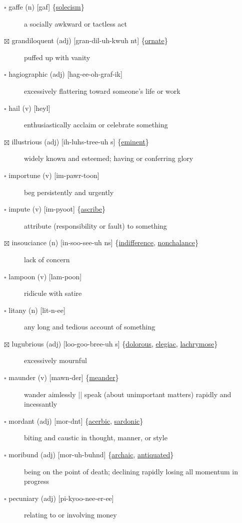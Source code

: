 \documentclass[11pt]{article}
\begin{document}
\begin{description}
\item[{$\square$ \label{org5dcf63b}gaffe (n) [gaf] \{\hyperref[orgc319573]{solecism}\}}] a socially awkward or tactless act
\item[{$\boxtimes$ \label{org409e1f2}grandiloquent (adj) [gran-dil-uh-kwuh nt] \{\hyperref[orgdab45ee]{ornate}\}}] puffed up with vanity
\item[{$\square$ hagiographic (adj) [hag-ee-oh-graf-ik]}] excessively flattering toward someone's life or work
\item[{$\square$ hail (v) [heyl]}] enthusiastically acclaim or celebrate something
\item[{$\boxtimes$ \label{org0ad47af}illustrious (adj) [ih-luhs-tree-uh s] \{\hyperref[orga5ef3a2]{eminent}\}}] widely known and esteemed; having or conferring glory
\item[{$\square$ importune (v) [im-pawr-toon]}] beg persistently and urgently
\item[{$\square$ \label{org41a621c}impute (v) [im-pyoot] \{\hyperref[org302821a]{ascribe}\}}] attribute (responsibility or fault) to something
\item[{$\boxtimes$ \label{org2634905} \label{org831b3eb}insouciance (n) [in-soo-see-uh ns] \{\hyperref[org95078ca]{indifference}, \hyperref[org490ece8]{nonchalance}\}}] lack of concern
\item[{$\square$ lampoon (v) [lam-poon]}] ridicule with satire
\item[{$\square$ litany (n) [lit-n-ee]}] any long and tedious account of something
\item[{$\boxtimes$ \label{org1b2c3d1}lugubrious (adj) [loo-goo-bree-uh s] \{\hyperref[org3018570]{dolorous}, \hyperref[orgd4fea5c]{elegiac}, \hyperref[org622edd6]{lachrymose}\}}] excessively mournful
\item[{$\square$ \label{org781ed7c}maunder (v) [mawn-der] \{\hyperref[orgac026bf]{meander}\}}] wander aimlessly || speak (about unimportant matters) rapidly and incessantly
\item[{$\square$ \label{org0780d5c} \label{org20916b3}mordant (adj) [mor-dnt] \{\hyperref[orgbcb2ff6]{acerbic}, \hyperref[org465533c]{sardonic}\}}] biting and caustic in thought, manner, or style
\item[{$\square$ \label{orga846e6f}moribund (adj) [mor-uh-buhnd] \{\hyperref[orge2aa941]{archaic}, \hyperref[org770b44b]{antiquated}\}}] being on the point of death; declining rapidly losing all momentum in progress
\item[{$\square$ pecuniary (adj) [pi-kyoo-nee-er-ee]}] relating to or involving money

\end{description}
\end{document}
